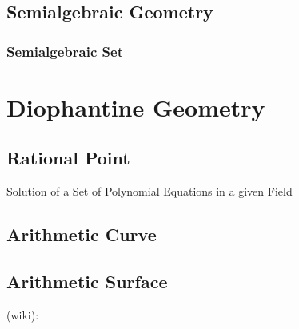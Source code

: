 \begin{itemize}
\begin{itemize}
\subsection{Semialgebraic Geometry}\label{sec:semialgebraic_geometry}

\subsubsection{Semialgebraic Set}\label{sec:semialgebraic_set}



\section{Diophantine Geometry}\label{sec:diophantine_geometry}

\subsection{Rational Point}\label{sec:rational_point}

Solution of a Set of Polynomial Equations in a given Field



\subsection{Arithmetic Curve}\label{sec:arithmetic_curve}


\subsection{Arithmetic Surface}\label{sec:arithmetic_surface}

(wiki):


\end{itemize}
\end{itemize}

